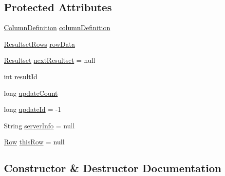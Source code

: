 \subsection*{Protected Attributes}
\begin{DoxyCompactItemize}
\item 
\mbox{\hyperlink{interfacecom_1_1mysql_1_1cj_1_1protocol_1_1_column_definition}{Column\+Definition}} \mbox{\hyperlink{classcom_1_1mysql_1_1cj_1_1protocol_1_1a_1_1result_1_1_native_resultset_a6808a3b33841e898b8d867ee6c54a726}{column\+Definition}}
\item 
\mbox{\hyperlink{interfacecom_1_1mysql_1_1cj_1_1protocol_1_1_resultset_rows}{Resultset\+Rows}} \mbox{\hyperlink{classcom_1_1mysql_1_1cj_1_1protocol_1_1a_1_1result_1_1_native_resultset_a5b0c226ce371d7e0b0e9cf55f80763eb}{row\+Data}}
\item 
\mbox{\hyperlink{interfacecom_1_1mysql_1_1cj_1_1protocol_1_1_resultset}{Resultset}} \mbox{\hyperlink{classcom_1_1mysql_1_1cj_1_1protocol_1_1a_1_1result_1_1_native_resultset_a60ece486b7010abcf502f602c8a4512f}{next\+Resultset}} = null
\item 
int \mbox{\hyperlink{classcom_1_1mysql_1_1cj_1_1protocol_1_1a_1_1result_1_1_native_resultset_a95af162c8937b7f09116f4845419d4a7}{result\+Id}}
\item 
long \mbox{\hyperlink{classcom_1_1mysql_1_1cj_1_1protocol_1_1a_1_1result_1_1_native_resultset_a5d808c3485d895b2f04b36a41ce52039}{update\+Count}}
\item 
long \mbox{\hyperlink{classcom_1_1mysql_1_1cj_1_1protocol_1_1a_1_1result_1_1_native_resultset_a204681a66f5f3a89ca1279af71ba4c35}{update\+Id}} = -\/1
\item 
String \mbox{\hyperlink{classcom_1_1mysql_1_1cj_1_1protocol_1_1a_1_1result_1_1_native_resultset_a572fa76007076521c09e5782bae3e87c}{server\+Info}} = null
\item 
\mbox{\hyperlink{interfacecom_1_1mysql_1_1cj_1_1result_1_1_row}{Row}} \mbox{\hyperlink{classcom_1_1mysql_1_1cj_1_1protocol_1_1a_1_1result_1_1_native_resultset_add93f641e5d10457ef2598c415342e92}{this\+Row}} = null
\end{DoxyCompactItemize}


\subsection{Constructor \& Destructor Documentation}
\mbox{\label{classcom_1_1mysql_1_1cj_1_1protocol_1_1a_1_1result_1_1_native_resultset_a048db4569b2d9b91c64676a2d9183e8d}} 

